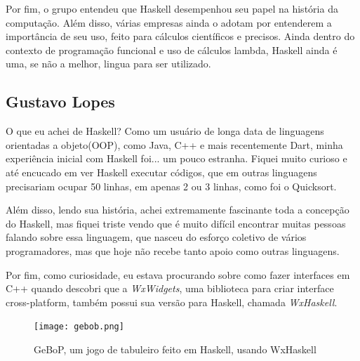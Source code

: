 \documentclass[
  12pt,				         %
  oneside,			       %
  a4paper,			       %
  english,		       	 %
  brazil,			      	 %
]{abntex2}
\begin{document}
    Por fim, o grupo entendeu que Haskell desempenhou seu papel na história da computação. Além disso,
    várias empresas ainda o adotam por entenderem a importância de seu uso, feito para cálculos científicos e precisos.
    Ainda dentro do contexto de programação funcional e uso de cálculos lambda, Haskell ainda é uma, se não a melhor,
    lingua para ser utilizado.

    \newpage

    \postextual

    
    \begin{apendicesenv}
      
        \partapendices

        \setcounter{chapter}{0}
        \renewcommand{\thechapter}{\Alph{chapter}}%

        \chapter{Gustavo Lopes}

        O que eu achei de Haskell? Como um usuário de longa data de linguagens orientadas a objeto(OOP), 
        como Java, C++ e mais recentemente Dart, minha experiência inicial com Haskell foi...
        um pouco estranha. Fiquei muito curioso e até encucado em ver Haskell executar códigos, que em
        outras linguagens precisariam ocupar 50 linhas, em apenas 2 ou 3 linhas, como foi o Quicksort.

        Além disso, lendo sua história, achei extremamente fascinante toda a concepção do Haskell,
        mas fiquei triste vendo que é muito difícil encontrar muitas pessoas falando sobre essa linguagem, que nasceu 
        do esforço coletivo de vários programadores, mas que hoje não recebe tanto apoio como outras linguagens.

        Por fim, como curiosidade, eu estava procurando sobre como fazer interfaces em C++ quando
        descobri que a \emph{WxWidgets}, uma biblioteca para criar interface cross-platform, também possui 
        sua versão para Haskell, chamada \emph{WxHaskell}.

        \begin{figure}[ht]
          \texttt{[image: gebob.png]}
          \caption{GeBoP, um jogo de tabuleiro feito em Haskell, usando WxHaskell}
        \end{figure}

        \newpage


\end{apendicesenv}
\end{document}
